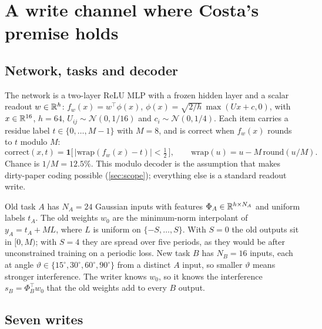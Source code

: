 \section{A write channel where Costa's premise holds}
\label{sec:method}

\subsection{Network, tasks and decoder}

The network is a two-layer ReLU MLP with a frozen hidden layer and a scalar readout \(w\in\mathbb{R}^{h}\):
\(f_w(x)=w^\top\phi(x)\), \(\phi(x)=\sqrt{2/h}\,\max(Ux+c,0)\), with \(x\in\mathbb{R}^{16}\), \(h=64\), \(U_{ij}\sim\mathcal N(0,1/16)\) and \(c_i\sim\mathcal N(0,1/4)\).
Each item carries a residue label \(t\in\{0,\dots,M-1\}\) with \(M=8\), and is correct when \(f_w(x)\) rounds to \(t\) modulo \(M\):
\begin{equation}
  \mathrm{correct}(x,t)=\mathbf{1}\big[\,|\mathrm{wrap}(f_w(x)-t)|<\tfrac12\,\big],\qquad \mathrm{wrap}(u)=u-M\,\mathrm{round}(u/M).
  \label{eq:decoder}
\end{equation}
Chance is \(1/M=12.5\%\).
This modulo decoder is the assumption that makes dirty-paper coding possible (\cref{sec:scope}); everything else is a standard readout write.

Old task \(A\) has \(N_A=24\) Gaussian inputs with features \(\Phi_A\in\mathbb{R}^{h\times N_A}\) and uniform labels \(t_A\).
The old weights \(w_0\) are the minimum-norm interpolant of \(y_A=t_A+ML\), where \(L\) is uniform on \(\{-S,\dots,S\}\).
With \(S=0\) the old outputs sit in \([0,M)\); with \(S=4\) they are spread over five periods, as they would be after unconstrained training on a periodic loss.
New task \(B\) has \(N_B=16\) inputs, each at angle \(\vartheta\in\{15^\circ,30^\circ,60^\circ,90^\circ\}\) from a distinct \(A\) input, so smaller \(\vartheta\) means stronger interference.
The writer knows \(w_0\), so it knows the interference \(s_B=\Phi_B^\top w_0\) that the old weights add to every \(B\) output.

\subsection{Seven writes}


